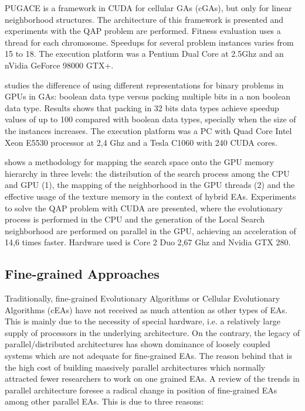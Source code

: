 \documentclass[prodmode,acmtecs]{acmsmall}
\begin{document}
PUGACE\cite{5586286} is a framework in CUDA for cellular GAs (cGAs), but only for linear neighborhood structures. The architecture of this framework is presented and experiments with the QAP problem are performed. Fitness evaluation uses a thread for each chromosome. Speedups for several problem instances varies from 15 to 18. The execution platform was a Pentium Dual Core at 2.5Ghz and an nVidia GeForce 98000 GTX+.

\cite{Pedemonte:2011:BOG:2001858.2002031} studies the difference of using different representations for binary problems in GPUs in GAs: boolean data type versus packing multiple bits in a non boolean data type. Results shows that
packing in 32 bits data types achieve speedup values of up to 100 compared with boolean data types, specially when the size of the instances increases. The execution platform was a PC with Quad Core Intel Xeon E5530 processor at 2,4 Ghz and a Tesla C1060 with 240 CUDA cores.

\cite{5586403} shows a methodology for mapping the search space onto the GPU memory hierarchy in three levels: the distribution of the search process among the CPU and GPU (1), the mapping of the neighborhood in the GPU threads (2) and the effective usage of the texture memory in the context of hybrid EAs. Experiments to solve the QAP problem with CUDA are presented, where the evolutionary process is performed in the CPU and the generation of the Local Search neighborhood are performed on parallel in the GPU, achieving an acceleration of 14,6 times faster. Hardware used is Core 2 Duo 2,67 Ghz and Nvidia GTX 280.

\subsection{Fine-grained Approaches}

Traditionally, fine-grained Evolutionary Algorithms or Cellular Evolutionary Algorithms (cEAs) have not received as much attention as other types of EAs. This is mainly due to the necessity of special hardware, i.e. a relatively large supply of processors in the underlying architecture. On the contrary, the legacy of parallel/distributed architectures has shown dominance of loosely coupled systems which are not adequate for fine-grained EAs. The reason behind that is the high cost of building massively parallel architectures which normally attracted fewer researchers to work on one grained EAs. A review of the trends in parallel architecture foresee a radical change in position of fine-grained EAs among other parallel EAs. This is due to three reasons:
\end{document}
